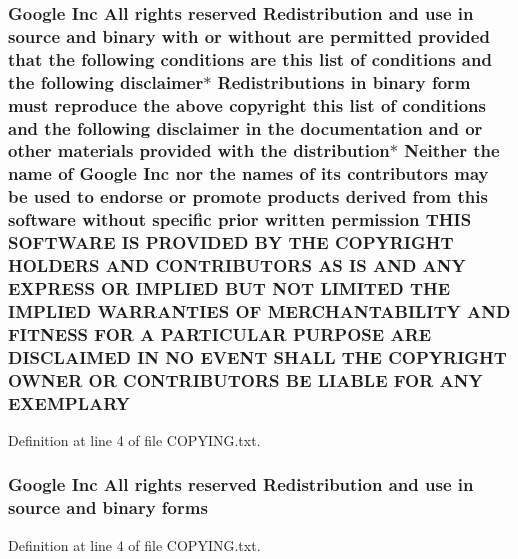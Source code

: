 \subsubsection[{\texorpdfstring{E\+X\+E\+M\+P\+L\+A\+RY}{EXEMPLARY}}]{\setlength{\rightskip}{0pt plus 5cm}Google Inc All rights reserved Redistribution and use in source and binary with or without are permitted provided that the following conditions are this {\bf list} of conditions and the following disclaimer$\ast$ Redistributions in binary form must reproduce the above copyright this {\bf list} of conditions and the following disclaimer in the documentation and or other materials provided with the distribution$\ast$ Neither the name of Google Inc nor the names of its contributors may be used to endorse or promote products derived from this software without specific prior written permission T\+H\+IS S\+O\+F\+T\+W\+A\+RE IS P\+R\+O\+V\+I\+D\+ED BY T\+HE C\+O\+P\+Y\+R\+I\+G\+HT H\+O\+L\+D\+E\+RS A\+ND C\+O\+N\+T\+R\+I\+B\+U\+T\+O\+RS AS IS A\+ND A\+NY E\+X\+P\+R\+E\+SS OR I\+M\+P\+L\+I\+ED B\+UT N\+OT L\+I\+M\+I\+T\+ED T\+HE I\+M\+P\+L\+I\+ED {\bf W\+A\+R\+R\+A\+N\+T\+I\+ES} OF M\+E\+R\+C\+H\+A\+N\+T\+A\+B\+I\+L\+I\+TY A\+ND F\+I\+T\+N\+E\+SS F\+OR A P\+A\+R\+T\+I\+C\+U\+L\+AR P\+U\+R\+P\+O\+SE A\+RE D\+I\+S\+C\+L\+A\+I\+M\+ED IN NO E\+V\+E\+NT S\+H\+A\+LL T\+HE C\+O\+P\+Y\+R\+I\+G\+HT O\+W\+N\+ER OR C\+O\+N\+T\+R\+I\+B\+U\+T\+O\+RS BE L\+I\+A\+B\+LE F\+OR A\+NY E\+X\+E\+M\+P\+L\+A\+RY}\hypertarget{COPYING_8txt_a414e855741ab5e799596c3a09878ad27}{}\label{COPYING_8txt_a414e855741ab5e799596c3a09878ad27}


Definition at line 4 of file C\+O\+P\+Y\+I\+N\+G.\+txt.

\subsubsection[{\texorpdfstring{forms}{forms}}]{\setlength{\rightskip}{0pt plus 5cm}Google Inc All rights reserved Redistribution and use in source and binary forms}\hypertarget{COPYING_8txt_a3a516dc4778586fff0d0168e57695086}{}\label{COPYING_8txt_a3a516dc4778586fff0d0168e57695086}


Definition at line 4 of file C\+O\+P\+Y\+I\+N\+G.\+txt.

